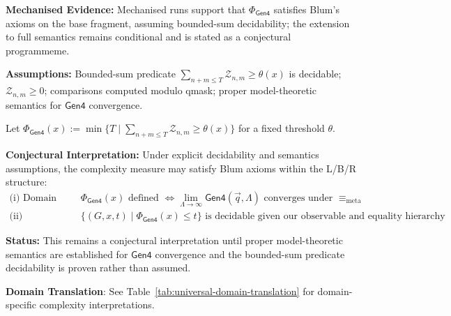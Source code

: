 \begin{notation}
\label{not:mechanised-evidence}
\textbf{Mechanised Evidence:} Mechanised runs support that $\Phi_{\mathsf{Gen4}}$ satisfies Blum's axioms on the base fragment, assuming bounded-sum decidability; the extension to full semantics remains conditional and is stated as a conjectural programmeme.

\textbf{Assumptions:} Bounded-sum predicate $\sum_{n+m\le T}\mathcal{Z}_{n,m}\ge\theta(x)$ is decidable; $\mathcal{Z}_{n,m}\ge0$; comparisons computed modulo qmask; proper model-theoretic semantics for $\mathsf{Gen4}$ convergence.
\end{notation}

\begin{notation}
\label{not:conjectural-interpretation}
\begin{conjecture}
\label{conj:internal-measure}
Let $\Phi_{\mathsf{Gen4}}(x):=\min\{T\mid \sum_{n+m\le T}\mathcal{Z}_{n,m}\ge \theta(x)\}$ for a fixed threshold $\theta$.

\textbf{Conjectural Interpretation:} Under explicit decidability and semantics assumptions, the complexity measure may satisfy Blum axioms within the L/B/R structure:
\begin{align}
\text{(i) Domain condition: } &\Phi_{\mathsf{Gen4}}(x) \text{ defined } \Leftrightarrow \lim_{\Lambda \to \infty} \mathsf{Gen4}(\vec{q}, \Lambda) \text{ converges under } \equiv_{\text{meta}} \\
\text{(ii) Decidability: } &\{(G,x,t) \mid \Phi_{\mathsf{Gen4}}(x) \leq t\} \text{ is decidable given our observable and equality hierarchy}
\end{align}

\textbf{Status:} This remains a conjectural interpretation until proper model-theoretic semantics are established for $\mathsf{Gen4}$ convergence and the bounded-sum predicate decidability is proven rather than assumed.

\textbf{Domain Translation}: See Table~\ref{tab:universal-domain-translation} for domain-specific complexity interpretations.
\end{conjecture}
\end{notation}

